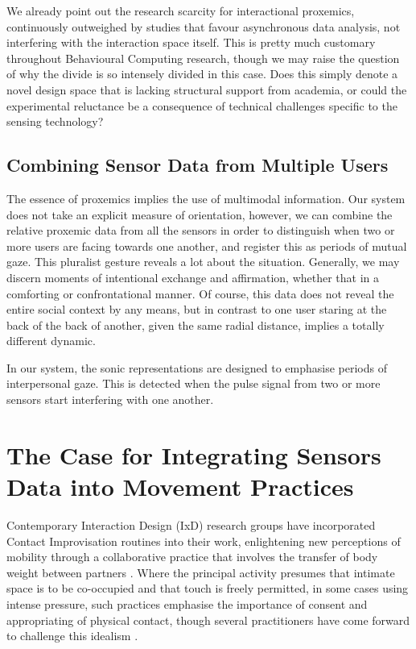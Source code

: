 We already point out the research scarcity for interactional proxemics, continuously outweighed by studies that favour asynchronous data analysis, not interfering with the interaction space itself.  This is pretty much customary throughout Behavioural Computing research, though we may raise the question of why the divide is so intensely divided in this case. Does this simply   denote a novel design space that is lacking structural support from academia, or could the experimental reluctance be a consequence of technical challenges specific to the sensing technology?

\subsection{Combining Sensor Data from Multiple Users}

The essence of proxemics implies the use of multimodal information. Our system does not take an explicit measure of orientation, however, we can combine the relative proxemic data from all the sensors in order to distinguish when two or more users are facing towards one another, and register this as periods of mutual gaze. This pluralist gesture reveals a lot about the situation. Generally, we may discern moments of intentional exchange and affirmation, whether that in a comforting or confrontational manner. Of course, this data does not reveal the entire social context by any means, but in contrast to one user staring at the back of the back of another, given the same radial distance, implies a totally different dynamic.

In our system, the sonic representations are designed to emphasise periods of interpersonal gaze. This is detected when the pulse signal from two or more sensors start interfering with one another. 

\section{The Case for Integrating Sensors Data into Movement Practices}

Contemporary Interaction Design (IxD) research groups have incorporated Contact Improvisation routines into their work, enlightening new perceptions of mobility through a collaborative practice that involves the transfer of body weight between partners \cite{bomba_somacoustics_2019, barrero_gonzalez_dance_2019}. Where the principal activity presumes that intimate space is to be co-occupied and that touch is freely permitted, in some cases using intense pressure, such practices emphasise the importance of consent and appropriating of physical contact, though several practitioners have come forward to challenge this idealism \cite{tai_exploring_2017,beaulieux_how_2019}.

